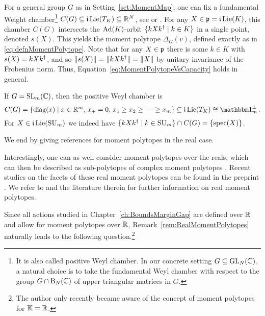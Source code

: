 \begin{remark}
	For a general group $G$ as in Setting~\ref{set:MomentMap}, one can fix a fundamental Weight chamber\footnote{It is also called positive Weyl chamber. In our concrete setting $G \subseteq \operatorname{GL}_N(\mathbb C)$, a natural choice is to take the fundamental Weyl chamber with respect to the group $G \cap \operatorname{B}_N(\mathbb C)$ of upper triangular matrices in $G$.}
	$C(G) \subseteq \mathfrak{i} \operatorname{Lie}(T_K) \subseteq \mathbb R^N$, see \cite[Definition~8.20]{HallBook} or \cite[Definition~3.1.11]{GoodmanWallachBook}. For any $X \in \mathfrak{p} = \mathfrak{i} \operatorname{Lie}(K)$, this chamber $C(G)$ intersects the $\operatorname{Ad}(K)$-orbit $\{ k X k^{\dagger} \mid k \in K \}$ in a single point, denoted $s(X)$. This yields the moment polytope $\Delta_G(v)$, defined exactly as in \eqref{eq:defnMomentPolytope}.
	Note that for any $X \in \mathfrak{p}$ there is some $k \in K$ with $s(X) = k X k^{\dagger}$, and so $\|s(X)\| = \|k X k^{\dagger}\| = \| X \|$ by unitary invariance of the Frobenius norm. Thus, Equation~\eqref{eq:MomentPolytopeVsCapacity} holds in general.
	
	If $G = \operatorname{SL}_m(\mathbb C)$, then the positive Weyl chamber is
		\[ C(G) = \{ \diag(x) \mid x \in \RR^m, \, x_+ = 0, \, x_1 \geq x_2 \geq \cdots \geq x_m\} \subseteq \imag \Lie(T_K) \cong \onePerp \, . \]
	For $X \in \mathfrak{i} \operatorname{Lie}(\operatorname{SU}_m)$ we indeed have $\{ k X k^{\dagger} \mid k \in \operatorname{SU}_m \} \cap C(G) = \{\operatorname{spec}(X)\}$.
	\hfill\remSymbol
\end{remark} %

We end by giving references for moment polytopes in the real case. 

\begin{remark}[Moment Polytopes for $\KK = \RR$] \label{rem:RealMomentPolytopes}
	Interestingly, one can as well consider moment polytopes over the reals, which can then be described as sub-polytopes of complex moment polytopes \cite[Theorem~3.1]{osheaSjamaar2000moment}. Recent studies on the facets of these real moment polytopes can be found in the preprint \cite{paradan2020moment}. We refer to \cite{osheaSjamaar2000moment, paradan2020moment} and the literature therein for further information on real moment polytopes.
	\hfill\remSymbol
\end{remark}

Since all actions studied in Chapter~\ref{ch:BoundsMarginGap} are defined over $\mathbb R$ and allow for moment polytopes over $\mathbb R$, Remark~\ref{rem:RealMomentPolytopes} naturally leads to the following question.\footnote{The author only recently became aware of the concept of moment polytopes for $\KK = \RR$.}

